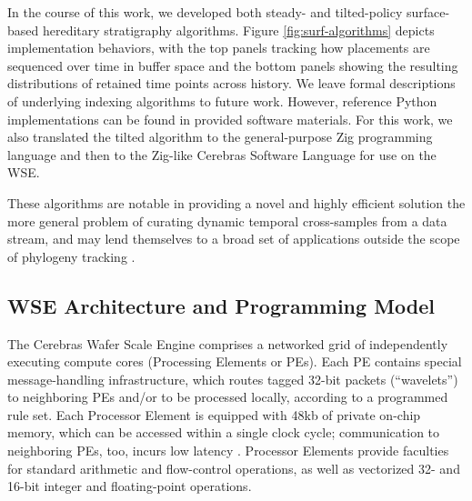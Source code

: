 

In the course of this work, we developed both steady- and tilted-policy surface-based hereditary stratigraphy algorithms.
Figure \ref{fig:surf-algorithms} depicts implementation behaviors, with the top panels tracking how placements are sequenced over time in buffer space and the bottom panels showing the resulting distributions of retained time points across history.
We leave formal descriptions of underlying indexing algorithms to future work.
However, reference Python implementations can be found in provided software materials.
For this work, we also translated the tilted algorithm to the general-purpose Zig programming language and then to the Zig-like Cerebras Software Language for use on the WSE.

These algorithms are notable in providing a novel and highly efficient solution the more general problem of curating dynamic temporal cross-samples from a data stream, and may lend themselves to a broad set of applications outside the scope of phylogeny tracking \citep{moreno2024algorithms}.




\subsection{WSE Architecture and Programming Model}

The Cerebras Wafer Scale Engine comprises a networked grid of independently executing compute cores (Processing Elements or PEs).
Each PE contains special message-handling infrastructure, which routes tagged 32-bit packets (``wavelets'') to neighboring PEs and/or to be processed locally, according to a programmed rule set.
Each Processor Element is equipped with 48kb of private on-chip memory, which can be accessed within a single clock cycle;
communication to neighboring PEs, too, incurs low latency \citep{buitrago2021neocortex}.
Processor Elements provide faculties for standard arithmetic and flow-control operations, as well as vectorized 32- and 16-bit integer and floating-point operations.

